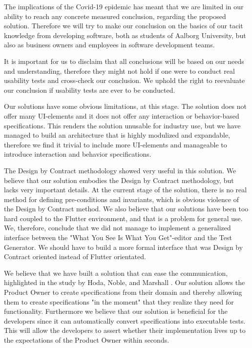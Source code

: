 The implications of the Covid-19 epidemic has meant that we are limited in our ability to reach any concrete measured conclusion, regarding the proposed solution.
Therefore we will try to make our conclusion on the basics of our tacit knowledge from developing software, both as students of Aalborg University, but also as business owners and employees in software development teams.

It is important for us to disclaim that all conclusions will be based on our needs and understanding, therefore they might not hold if one were to conduct real usability tests and cross-check our conclusion.
We uphold the right to reevaluate our conclusion if usability tests are ever to be conducted.

Our solutions have some obvious limitations, at this stage.
The solution does not offer many UI-elements and it does not offer any interaction or behavior-based specifications.
This renders the solution unusable for industry use, but we have managed to build an architecture that is highly modulized and expandable, therefore we find it trivial to include more UI-elements and manageable to introduce interaction and behavior specifications.

The Design by Contract methodology showed very useful in this solution.
We believe that our solution embodies the Design by Contract methodology, but lacks very important details.
At the current stage of the solution, there is no real method for defining pre-conditions and invariants, which is obvious violence of the Design by Contract method.
We also believe that our solutions have been too hard coupled to the Flutter environment, and that is a problem for general use. 
We, therefore, conclude that we did not manage to implement a generalized interface between the "What You See Is What You Get"-editor and the Test Generator.
We should have to build a more formal interface that was Design by Contract oriented instead of Flutter orientated.

We believe that we have built a solution that can ease the communication, highlighted in the study by Hoda, Noble, and Marshall \cite{Hoda2011TheIO}. 
Our solution allows the Product Owner to create specifications from their domain and thereby allowing them to create specifications "in the moment" that they realize they need for functionality.
Furthermore we believe that our solution is beneficial for the developers since it can automatically convert specifications into executable tests.
This will allow the developers to assert whether their implementation lives up to the expectations of the Product Owner within seconds.